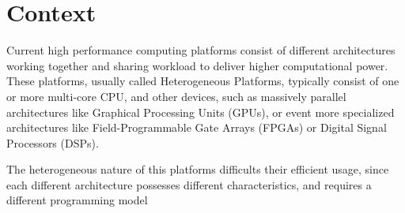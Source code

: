 \section{Context}

Current high performance computing platforms consist of different architectures working together and sharing workload to deliver higher computational power. These platforms, usually called Heterogeneous Platforms, typically consist of one or more multi-core CPU, and other devices, such as massively parallel architectures like Graphical Processing Units (GPUs), or event more specialized architectures like Field-Programmable Gate Arrays (FPGAs) or Digital Signal Processors (DSPs).

The heterogeneous nature of this platforms difficults their efficient usage, since each different architecture possesses different characteristics, and requires a different programming model
